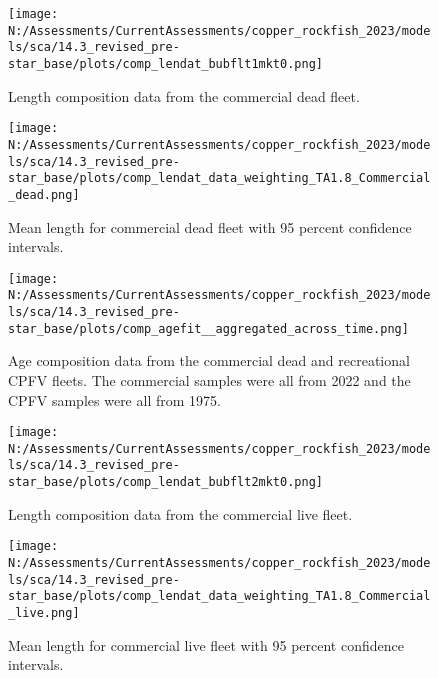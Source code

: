 \documentclass[11pt,
  english,
  letterpaper,
]{article}
\begin{document}
\begin{figure}
\centering
\texttt{[image: N:/Assessments/CurrentAssessments/copper\_rockfish\_2023/models/sca/14.3\_revised\_pre-star\_base/plots/comp\_lendat\_bubflt1mkt0.png]}
\caption{Length composition data from the commercial dead fleet.\label{fig:com-dead-len-data}}
\end{figure}

\pagebreak

\begin{figure}
\centering
\texttt{[image: N:/Assessments/CurrentAssessments/copper\_rockfish\_2023/models/sca/14.3\_revised\_pre-star\_base/plots/comp\_lendat\_data\_weighting\_TA1.8\_Commercial\_dead.png]}
\caption{Mean length for commercial dead fleet with 95 percent confidence intervals.\label{fig:mean-com-dead-len-data}}
\end{figure}

\pagebreak

\begin{figure}
\centering
\texttt{[image: N:/Assessments/CurrentAssessments/copper\_rockfish\_2023/models/sca/14.3\_revised\_pre-star\_base/plots/comp\_agefit\_\_aggregated\_across\_time.png]}
\caption{Age composition data from the commercial dead and recreational CPFV fleets. The commercial samples were all from 2022 and the CPFV samples were all from 1975.\label{fig:com-dead-age-data}}
\end{figure}

\pagebreak

\begin{figure}
\centering
\texttt{[image: N:/Assessments/CurrentAssessments/copper\_rockfish\_2023/models/sca/14.3\_revised\_pre-star\_base/plots/comp\_lendat\_bubflt2mkt0.png]}
\caption{Length composition data from the commercial live fleet.\label{fig:com-live-len-data}}
\end{figure}

\pagebreak

\begin{figure}
\centering
\texttt{[image: N:/Assessments/CurrentAssessments/copper\_rockfish\_2023/models/sca/14.3\_revised\_pre-star\_base/plots/comp\_lendat\_data\_weighting\_TA1.8\_Commercial\_live.png]}
\caption{Mean length for commercial live fleet with 95 percent confidence intervals.\label{fig:mean-com-live-len-data}}
\end{figure}
\end{document}
